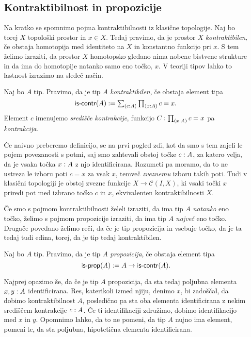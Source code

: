 \subsection{Kontraktibilnost in propozicije}
Na kratko se spomnimo pojma kontraktibilnosti iz klasične topologije. Naj bo torej \(X\) topološki prostor in \(x \in X\). Tedaj pravimo, da je prostor \(X\) \emph{kontraktibilen}, če obstaja homotopija med identiteto na \(X\) in konstantno funkcijo pri \(x\). S tem želimo izraziti, da prostor \(X\) homotopsko gledano nima nobene bistvene strukture in da ima do homotopije natanko samo eno točko, \(x\). V teoriji tipov lahko to lastnost izrazimo na sledeč način.
\begin{definicija}
  Naj bo \(A\) tip. Pravimo, da je tip \(A\) \emph{kontraktibilen}, če obstaja element tipa
  \[\textnormal{\textsf{is-contr}}(A) := \textstyle \sum_{\left( c : A \right)} \textstyle \prod_{\left( x : A \right)} c = x.\]
  Element \(c\) imenujemo \emph{središče kontrakcije}, funkcijo
  \(C : \textstyle \prod_{\left( x : A \right)} c = x\) pa \emph{kontrakcija}.
\end{definicija}
Če naivno preberemo definicijo, se na prvi pogled zdi, kot da smo s tem zajeli le pojem povezanosti s potmi, saj smo zahtevali obstoj točke \(c : A\), za katero velja, da je vsaka točka \(x : A\) z njo identificirana. Razumeti pa moramo, da to ne ustreza le izboru poti \(c = x\) za vsak \(x\), temveč \emph{zveznemu} izboru takih poti. Tudi v klasični topologiji je obstoj zvezne funkcije \(X \to \mathcal{C}(I, X)\), ki vsaki točki \(x\) priredi pot med izbrano točko \(c\) in \(x\), ekvivalenten kontraktibilnosti \(X\).

Če smo s pojmom kontraktibilnosti želeli izraziti, da ima tip \(A\) \emph{natanko} eno točko, želimo s pojmom propozicije izraziti, da ima tip \(A\) \emph{največ} eno točko. Drugače povedano želimo reči, da če je tip propozicija in vsebuje točko, da je ta tedaj tudi edina, torej, da je tip tedaj kontraktibilen.

\begin{definicija}
  Naj bo \(A\) tip. Pravimo, da je tip \(A\) \emph{propozicija}, če obstaja element tipa
  \[\textnormal{\textsf{is-prop}}(A) := A \to \textnormal{\textsf{is-contr}}(A).\]
\end{definicija}

Najprej opazimo še, da če je tip \(A\) propozicija, da sta tedaj poljubna elementa \(x, y : A\) identificirana. Res, katerikoli izmed njiju, denimo \(x\), bi zadoščal, da dobimo kontraktibilnost \(A\), posledično pa sta oba elementa identificirana z nekim središčem kontrakcije \(c : A\). Če ti identifikaciji združimo, dobimo identifikacijo med \(x\) in \(y\). Opomnimo lahko, da to ne pomeni, da tip \(A\) nujno ima element, pomeni le, da sta poljubna, hipotetična elementa identificirana.

